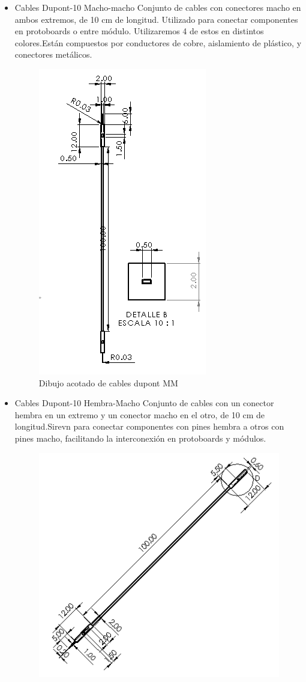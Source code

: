 \begin{itemize}
\begin{itemize}
    \item Cables Dupont-10 Macho-macho
    Conjunto de cables con conectores macho en ambos extremos, de 10 cm de longitud. Utilizado para conectar componentes en protoboards o entre módulo. Utilizaremos 4 de estos en distintos colores.Están compuestos por conductores de cobre, aislamiento de plástico, y conectores metálicos.
    \begin{figure}[H]
        \centering
        \includegraphics[scale=0.7]{32/img/dupontMMCotas.PNG}
        \caption{Dibujo acotado de cables dupont MM}
        \label{fig:enter-label}
    \end{figure}
    \item Cables Dupont-10 Hembra-Macho
    Conjunto de cables con un conector hembra en un extremo y un conector macho en el otro, de 10 cm de longitud.Sirevn para conectar componentes con pines hembra a otros con pines macho, facilitando la interconexión en protoboards y módulos.
    \begin{figure}[H]
        \centering
        \includegraphics[scale=0.7]{32/img/dupontHembraMachoCotas.PNG}

\end{figure}
\end{itemize}
\end{itemize}
